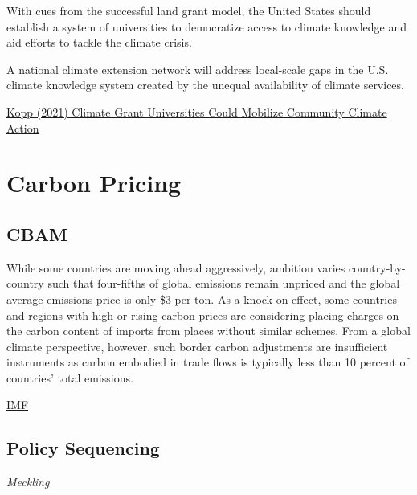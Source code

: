\documentclass[
]{book}
\begin{document}
With cues from the successful land grant model, the United States should establish a system of universities to democratize access to climate knowledge and aid efforts to tackle the climate crisis.

A national climate extension network will address local-scale gaps in the U.S. climate knowledge system created by the unequal availability of climate services.

\href{https://eos.org/opinions/climate-grant-universities-could-mobilize-community-climate-action}{Kopp (2021) Climate Grant Universities Could Mobilize Community Climate Action}

\hypertarget{carbon-pricing}{%
\chapter{Carbon Pricing}\label{carbon-pricing}}

\hypertarget{cbam}{%
\section{CBAM}\label{cbam}}

While some countries are moving ahead aggressively, ambition varies country-by-country such that four-fifths of global emissions remain unpriced and the global average emissions price is only \$3 per ton. As a knock-on effect, some countries and regions with high or rising carbon prices are considering placing charges on the carbon content of imports from places without similar schemes. From a global climate perspective, however, such border carbon adjustments are insufficient instruments as carbon embodied in trade flows is typically less than 10 percent of countries' total emissions.

\href{https://blogs.imf.org/2021/06/18/a-proposal-to-scale-up-global-carbon-pricing/}{IMF}

\hypertarget{policy-sequencing}{%
\section{Policy Sequencing}\label{policy-sequencing}}

\emph{Meckling}
\end{document}
